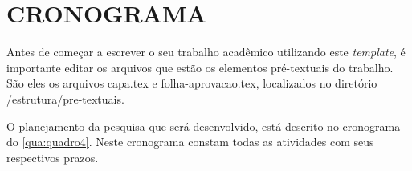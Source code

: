 
\chapter{CRONOGRAMA}
\label{chap:cronograma}

Antes de começar a escrever o seu trabalho acadêmico utilizando este \emph{template}, é importante editar os arquivos que estão os elementos pré-textuais do trabalho.
São eles os arquivos {\ttfamily capa.tex} e {\ttfamily folha-aprovacao.tex}, localizados no diretório  {\ttfamily /estrutura/pre-textuais}.

O planejamento da pesquisa que será desenvolvido, está descrito no cronograma do \autoref{qua:quadro4}. Neste cronograma constam todas as atividades com seus respectivos prazos.

